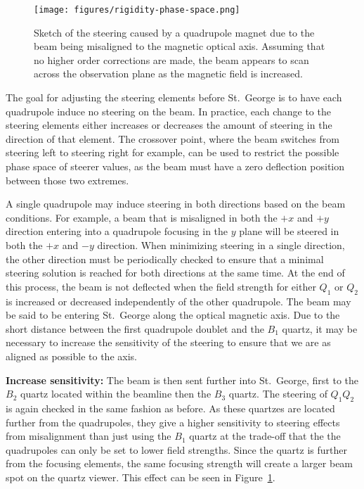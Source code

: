 \begin{figure}[t]
    \begin{center}
        \centerline{\texttt{[image: figures/rigidity-phase-space.png]}}
        \caption[Sketch of quadrupole steering of misaligned beam]{Sketch
        of the steering caused by a quadrupole magnet due to the beam
        being misaligned to the magnetic optical axis. Assuming that no
        higher order corrections are made, the beam appears to scan
        across the observation plane as the magnetic field is
        increased.}
        \label{fig:steering}
    \end{center}
\end{figure}

The goal for adjusting the steering elements before St.\ George is to
have each quadrupole induce no steering on the beam. In practice, each
change to the steering elements either increases or decreases the amount
of steering in the direction of that element. The crossover point, where
the beam switches from steering left to steering right for example, can
be used to restrict the possible phase space of steerer values, as the
beam must have a zero deflection position between those two extremes.

A single quadrupole may induce steering in both directions based on the
beam conditions. For example, a beam that is misaligned in both the $+x$
and $+y$ direction entering into a quadrupole focusing in the $y$ plane
will be steered in both the $+x$ and $-y$ direction. When minimizing
steering in a single direction, the other direction must be periodically
checked to ensure that a minimal steering solution is reached for both
directions at the same time.
%
At the end of this process, the beam is not deflected when the field
strength for either $Q_1$ or $Q_2$ is increased or decreased
independently of the other quadrupole. The beam may be said to be
entering St.\ George along the optical magnetic axis. Due to the short
distance between the first quadrupole doublet and the $B_1$ quartz, it
may be necessary to increase the sensitivity of the steering to ensure
that we are as aligned as possible to the axis.

\textbf{Increase sensitivity:}
The beam is then sent further into St.\ George, first to the $B_2$
quartz located within the beamline then the $B_3$ quartz. The steering
of $Q_1Q_2$ is again checked in the same fashion as before. As these
quartzes are located further from the quadrupoles, they give a higher
sensitivity to steering effects from misalignment than just using the  %
$B_1$ quartz at the trade-off that the the quadrupoles can only be set
to lower field strengths. Since the quartz is further from the focusing
elements, the same focusing strength will create a larger beam spot on
the quartz viewer. This effect can be seen in Figure~\ref{fig:steering}.

